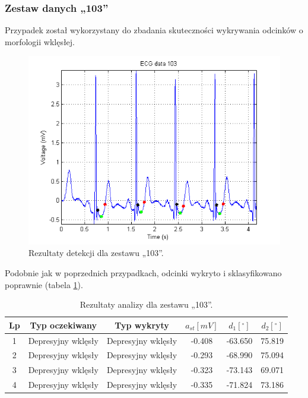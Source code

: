 \subsubsection*{Zestaw danych „103”}
Przypadek został wykorzystany do zbadania skuteczności wykrywania odcinków o morfologii wklęsłej.
\begin{figure}[H]
	\centering
	\includegraphics[width=1\textwidth]{ST_INTERVAL/img/ST_zestaw103.png}
	\caption{Rezultaty detekcji dla zestawu „103”.}
	\label{fig:ST_zestaw103}
\end{figure}
Podobnie jak w poprzednich przypadkach, odcinki wykryto i sklasyfikowano poprawnie (tabela \ref{tab:ST_zestaw103}).
\begin{table}[H]
	\centering
	\caption{Rezultaty analizy dla zestawu „103”.}
	\label{tab:ST_zestaw103}
	\begin{tabular}{|c|c|c|c|c|c|}
	\hline
	Lp & Typ oczekiwany & Typ wykryty & $ a_{st} [mV] $ & $ d_1 [^\circ] $ & $ d_2 [^\circ] $ \\ \hline
	1	&	Depresyjny wklęsły	&	Depresyjny wklęsły	&	-0.408	&	-63.650	&	75.819 \\ \hline
	2	&	Depresyjny wklęsły	&	Depresyjny wklęsły	&	-0.293	&	-68.990	&	75.094 \\ \hline
	3	&	Depresyjny wklęsły	&	Depresyjny wklęsły	&	-0.323	&	-73.143	&	69.071 \\ \hline
	4	&	Depresyjny wklęsły	&	Depresyjny wklęsły	&	-0.335	&	-71.824	&	73.186 \\ \hline
	\end{tabular}
\end{table}


